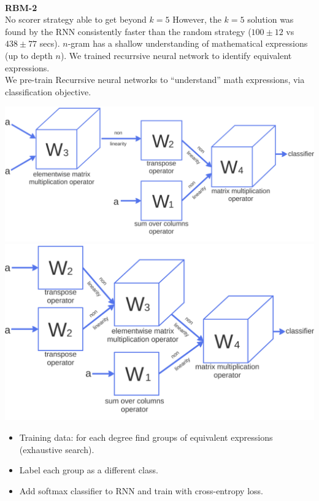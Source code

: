 \documentclass[landscape,a0b]{a0poster_csml_v2}
\begin{document}
\begin{poster}
\begin{PosterColumn}
\begin{minipage}[hc]{\textwidth}
\begin{center}
\begin{tabular}{cccc}
      \end{tabular}
  \end{center}
\end{minipage}
\\
{\bf RBM-2}\\
No scorer strategy able to get beyond $k=5$ 
However, the $k = 5$ solution was found by the RNN consistently faster than the random strategy ($100 \pm 12$ vs $438 \pm 77$ secs). 
$n$-gram has a shallow understanding of mathematical expressions (up to depth $n$).
We trained recurrsive neural network to identify equivalent expressions.\\
We pre-train Recurrsive neural networks to ``understand'' math expressions, via
classification objective.\\
\begin{minipage}[hc]{\textwidth}
  \hfill
  \includegraphics[width=0.4\linewidth]{imgs/tnn.png}
  \hfill
  \includegraphics[width=0.4\linewidth]{imgs/tnn2.png}
  \hfill
\end{minipage}

\begin{itemize}
  \item Training data: for each degree find groups of equivalent expressions (exhaustive search).
  \item Label each group as a different class.
  \item Add softmax classifier to RNN and train with cross-entropy loss.
\end{itemize}


\end{PosterColumn}
\end{poster}
\end{document}
